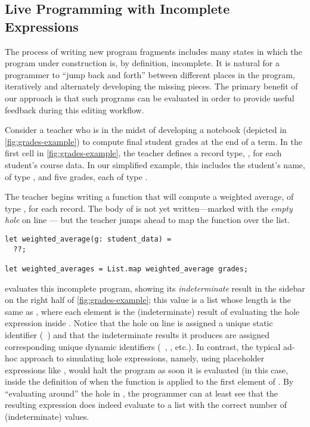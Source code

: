 \subsection{Live Programming with Incomplete Expressions}

The process of writing new program fragments includes many states in which the
program under construction is, by definition, incomplete.
%
It is natural for a programmer to ``jump back and forth'' between different
places in the program, iteratively and alternately developing the missing
pieces.
%
The primary benefit of our approach is that such programs can be evaluated in
order to provide useful feedback during this editing workflow.



Consider a teacher who is in the midst of developing a \HazelnutLive{} notebook
(depicted in \autoref{fig:grades-example}) to compute final student grades at
the end of a term.
%
In the first cell in \autoref{fig:grades-example}, the teacher defines a record
type, , for each student's course data.
%
In our simplified example, this includes the student's name, of type
, and five grades, each of type .

%
The teacher begins writing a  function that will
compute a weighted average, of type , for each 
record.
%
The body of  is not yet written---marked with the
\emph{empty hole} on line --- but the teacher jumps ahead to map the
function over the  list.

\begin{lstlisting}
let weighted_average(g: student_data) =
  ??;

let weighted_averages = List.map weighted_average grades;
\end{lstlisting}

\noindent
%
\HazelnutLive{} evaluates this incomplete program, showing its
\emph{indeterminate} result in the sidebar on the right half of
\autoref{fig:grades-example}; this value is a list whose length is the same as
, where each element is the (indeterminate) result of evaluating the
hole expression inside .
%
Notice that the hole on line  is assigned a unique static identifier
(\ie{}~) and that the indeterminate results it produces are assigned
corresponding unique dynamic identifiers (\ie{}~, , etc.).
%
In contrast, the typical ad-hoc approach to simulating hole expressions, namely,
using placeholder expressions like , would halt
the program as soon it is evaluated (in this case, inside the definition of
 when the function is applied to the first element of .
%
By ``evaluating around'' the hole in \HazelnutLive{}, the programmer can at
least see that the resulting expression does indeed evaluate to a list with the
correct number of (indeterminate) values.

